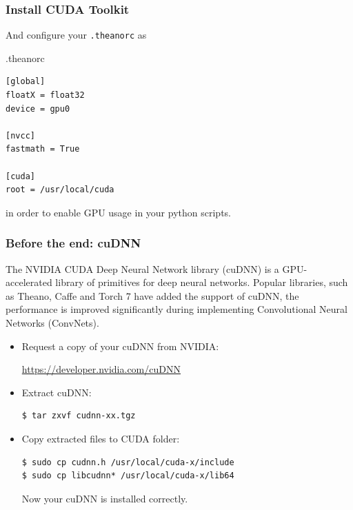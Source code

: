 \documentclass{beamer}
\begin{document}
\begin{frame}[fragile]
\frametitle{Install CUDA Toolkit}
And configure your \texttt{.theanorc} as
\begin{block}{.theanorc}
\begin{verbatim}
[global]
floatX = float32
device = gpu0

[nvcc]
fastmath = True

[cuda]
root = /usr/local/cuda
\end{verbatim}
\end{block}
in order to enable GPU usage in your python scripts.
\end{frame}

\begin{frame}[fragile]
  \frametitle{Before the end: cuDNN}

  The NVIDIA CUDA Deep Neural Network library (cuDNN) is a GPU-accelerated library of primitives for deep neural networks. Popular libraries, such as Theano, Caffe and Torch 7 have added the support of cuDNN, the performance is improved significantly during implementing Convolutional Neural Networks (ConvNets).

  \begin{itemize}
    \item Request a copy of your cuDNN from NVIDIA:

      \url{https://developer.nvidia.com/cuDNN}
    \item Extract cuDNN:
\begin{verbatim}
$ tar zxvf cudnn-xx.tgz
\end{verbatim}
    \item Copy extracted files to CUDA folder:
\begin{verbatim}
$ sudo cp cudnn.h /usr/local/cuda-x/include
$ sudo cp libcudnn* /usr/local/cuda-x/lib64
\end{verbatim}
      Now your cuDNN is installed correctly.
  \end{itemize}
\end{frame}
\end{document}

